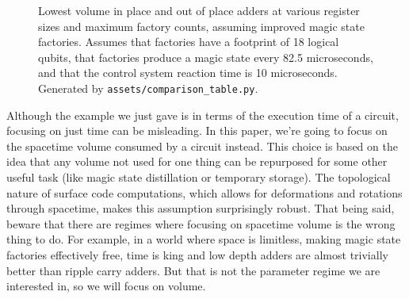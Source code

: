 \documentclass[onecolumn,unpublished]{quantumarticle}
\theoremstyle{definition}
\theoremstyle{definition}
\theoremstyle{definition}
\begin{document}
\begin{figure}
    \centering
    \caption{
        Lowest volume in place and out of place adders at various register sizes and maximum factory counts, assuming improved magic state factories.
        Assumes that factories have a footprint of 18 logical qubits, that factories produce a magic state every 82.5 microseconds, and that the control system reaction time is 10 microseconds.
        Generated by \texttt{assets/comparison\_table.py}.
    }
    \label{fig:minioh}
\end{figure}

Although the example we just gave is in terms of the execution time of a circuit, focusing on just time can be misleading.
In this paper, we're going to focus on the spacetime volume consumed by a circuit instead.
This choice is based on the idea that any volume not used for one thing can be repurposed for some other useful task (like magic state distillation or temporary storage).
The topological nature of surface code computations, which allows for deformations and rotations through spacetime, makes this assumption surprisingly robust.
That being said, beware that there are regimes where focusing on spacetime volume is the wrong thing to do.
For example, in a world where space is limitless, making magic state factories effectively free, time is king and low depth adders are almost trivially better than ripple carry adders.
But that is not the parameter regime we are interested in, so we will focus on volume.
\end{document}
